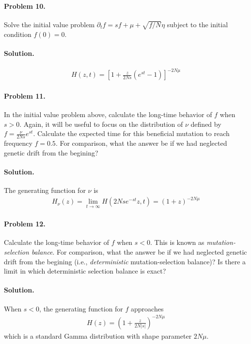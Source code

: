 \documentclass[11pt]{article}
\begin{document}
\paragraph{Problem 10.} Solve the initial value problem $\partial_t f = s f + \mu + \sqrt{f/N} \eta$ subject to the initial condition $f(0)=0$. 

\paragraph{Solution.}
\begin{align}
H(z,t) = \left[ 1 + \frac{z}{2Ns} \left( e^{st} - 1 \right) \right]^{-2N\mu} 
\end{align}

\paragraph{Problem 11.} In the initial value problem above, calculate the long-time behavior of $f$ when $s>0$. Again, it will be useful to focus on the distribution of $\nu$ defined by $f = \frac{\nu}{2Ns} e^{st}$. Calculate the expected time for this beneficial mutation to reach frequency $f=0.5$. For comparison, what the answer be if we had neglected genetic drift from the begining? 

\paragraph{Solution.} The generating function for $\nu$ is 
\begin{align}
H_\nu(z) = \lim_{t \to \infty} H(2Ns e^{-st} z,t) = (1+z)^{-2N\mu} 
\end{align}

\paragraph{Problem 12.} Calculate the long-time behavior of $f$ when $s < 0$. This is known as \emph{mutation-selection balance}. For comparison, what the answer be if we had neglected genetic drift from the begining (i.e., \emph{deterministic} mutation-selection balance)? Is there a limit in which deterministic selection balance is exact?  

\paragraph{Solution.} When $s < 0$, the generating function for $f$ approaches
\begin{align}
H(z) = \left( 1 + \frac{z}{2N|s|} \right)^{-2N\mu}
\end{align}
which is a standard Gamma distribution with shape parameter $2N\mu$. 
\end{document}
